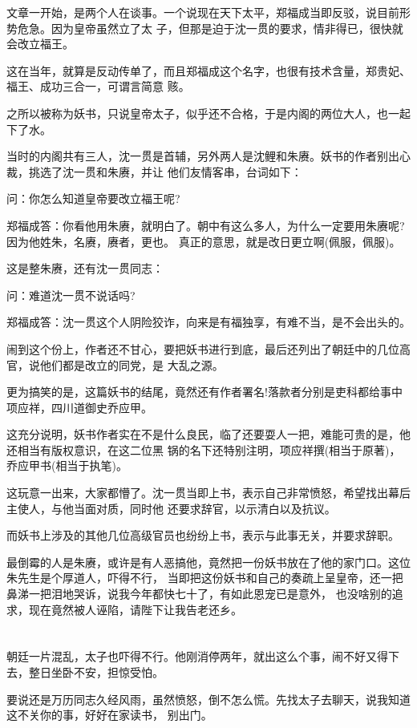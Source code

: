 \documentclass[11pt,a4paper,onecolumn]{article}
\begin{document}
文章一开始，是两个人在谈事。一个说现在天下太平，郑福成当即反驳，说目前形势危急。因为皇帝虽然立了太
子，但那是迫于沈一贯的要求，情非得已，很快就会改立福王。

这在当年，就算是反动传单了，而且郑福成这个名字，也很有技术含量，郑贵妃、福王、成功三合一，可谓言简意
赅。

之所以被称为妖书，只说皇帝太子，似乎还不合格，于是内阁的两位大人，也一起下了水。

当时的内阁共有三人，沈一贯是首辅，另外两人是沈鲤和朱赓。妖书的作者别出心裁，挑选了沈一贯和朱赓，并让
他们友情客串，台词如下：

问：你怎么知道皇帝要改立福王呢?

郑福成答：你看他用朱赓，就明白了。朝中有这么多人，为什么一定要用朱赓呢?因为他姓朱，名赓，赓者，更也。
真正的意思，就是改日更立啊(佩服，佩服)。

这是整朱赓，还有沈一贯同志：

问：难道沈一贯不说话吗?

郑福成答：沈一贯这个人阴险狡诈，向来是有福独享，有难不当，是不会出头的。

闹到这个份上，作者还不甘心，要把妖书进行到底，最后还列出了朝廷中的几位高官，说他们都是改立的同党，是
大乱之源。

更为搞笑的是，这篇妖书的结尾，竟然还有作者署名!落款者分别是吏科都给事中项应祥，四川道御史乔应甲。

这充分说明，妖书作者实在不是什么良民，临了还要耍人一把，难能可贵的是，他还相当有版权意识，在这二位黑
锅的名下还特别注明，项应祥撰(相当于原著)，乔应甲书(相当于执笔)。

这玩意一出来，大家都懵了。沈一贯当即上书，表示自己非常愤怒，希望找出幕后主使人，与他当面对质，同时他
还要求辞官，以示清白以及抗议。

而妖书上涉及的其他几位高级官员也纷纷上书，表示与此事无关，并要求辞职。

最倒霉的人是朱赓，或许是有人恶搞他，竟然把一份妖书放在了他的家门口。这位朱先生是个厚道人，吓得不行，
当即把这份妖书和自己的奏疏上呈皇帝，还一把鼻涕一把泪地哭诉，说我今年都快七十了，有如此恩宠已是意外，
也没啥别的追求，现在竟然被人诬陷，请陛下让我告老还乡。

\section[\thesection]{}

朝廷一片混乱，太子也吓得不行。他刚消停两年，就出这么个事，闹不好又得下去，整日坐卧不安，担惊受怕。

要说还是万历同志久经风雨，虽然愤怒，倒不怎么慌。先找太子去聊天，说我知道这不关你的事，好好在家读书，
别出门。
\end{document}
